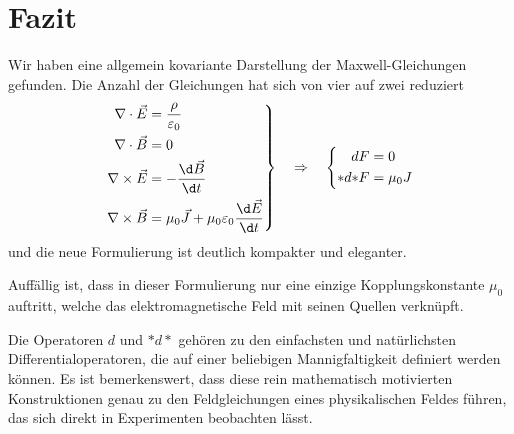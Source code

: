 \section{Fazit}
Wir haben eine allgemein kovariante Darstellung der Maxwell-Gleichungen gefunden. Die Anzahl der Gleichungen hat sich von vier auf zwei reduziert
\[
\left.
\begin{aligned}
	\nabla \cdot \vec{E} &= \frac{\rho}{\varepsilon_0} \\
	\nabla \cdot \vec{B} &= 0 \\
	\nabla \times \vec{E} &= - \frac{\d \vec{B}}{\d t} \\
	\nabla \times \vec{B} &= \mu_0 \vec{J} + \mu_0 \varepsilon_0 \frac{\d \vec{E}}{\d t}
\end{aligned}
\right\}
\quad\Rightarrow\quad
\left\{
\begin{aligned}
	dF &= 0 \\
	{\ast}d{\ast}F &= \mu_0 J 
\end{aligned}
\right.
\]
und die neue Formulierung ist deutlich kompakter und eleganter.

Auffällig ist, dass in dieser Formulierung nur eine einzige Kopplungskonstante $\mu_0$ auftritt, welche das elektromagnetische Feld mit seinen Quellen verknüpft.  

Die Operatoren $d$ und $\ast d \ast$ gehören zu den einfachsten und natürlichsten Differentialoperatoren, die auf einer beliebigen Mannigfaltigkeit definiert werden können. Es ist bemerkenswert, dass diese rein mathematisch motivierten Konstruktionen genau zu den Feldgleichungen eines physikalischen Feldes führen, das sich direkt in Experimenten beobachten lässt.


